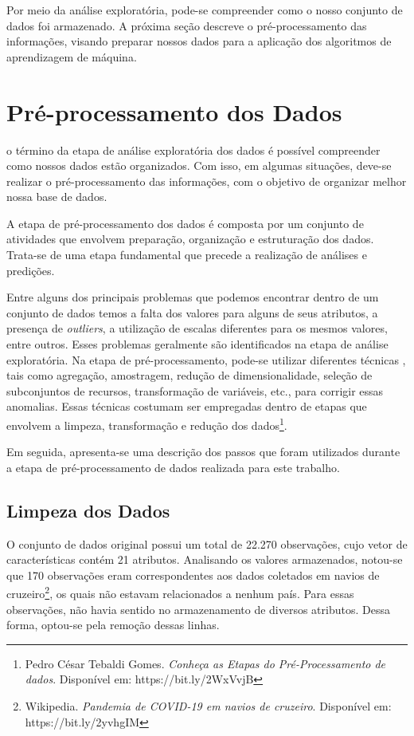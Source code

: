 \documentclass{ieeeaccess}
\begin{document}
Por meio da análise exploratória, pode-se compreender como o nosso conjunto de dados foi armazenado. A próxima seção descreve o pré-processamento das informações, visando preparar nossos dados para a aplicação dos algoritmos de aprendizagem de máquina.

\section{Pré-processamento dos Dados}

\label{sec:introduction}  o término da etapa de análise exploratória dos dados é possível compreender como nossos dados estão organizados. Com isso, em algumas situações, deve-se realizar o pré-processamento das informações, com o objetivo de organizar melhor nossa base de dados. 

A etapa de pré-processamento dos dados é composta por um conjunto de atividades que envolvem preparação, organização e estruturação dos dados. Trata-se de uma etapa fundamental que precede a realização de análises e predições.

Entre alguns dos principais problemas que podemos encontrar dentro de um conjunto de dados temos a falta dos valores para alguns de seus atributos, a presença de \textit{ outliers}, a utilização de escalas diferentes para os mesmos valores, entre outros. Esses problemas geralmente são identificados na etapa de análise exploratória. Na etapa de pré-processamento, pode-se utilizar diferentes técnicas \cite{b20}, tais como agregação, amostragem, redução de dimensionalidade, seleção de subconjuntos de recursos, transformação de variáveis, etc., para corrigir essas anomalias. Essas técnicas costumam ser empregadas dentro de etapas que envolvem a limpeza, transformação e redução dos dados\footnote{Pedro César Tebaldi Gomes. \textit{Conheça as Etapas do Pré-Processamento de dados}. Disponível em: https://bit.ly/2WxVvjB}.

Em seguida, apresenta-se uma descrição dos passos que foram utilizados durante a etapa de pré-processamento de dados realizada para este trabalho.

\subsection{Limpeza dos Dados}

O conjunto de dados original possui um total de 22.270 observações, cujo vetor de características contém 21 atributos. Analisando os valores armazenados, notou-se que 170 observações eram correspondentes aos dados coletados em navios de cruzeiro\footnote{Wikipedia. \textit{Pandemia de COVID-19 em navios de cruzeiro}. Disponível em: https://bit.ly/2yvhgIM}, os quais não estavam relacionados a nenhum país. Para essas observações, não havia sentido no armazenamento de diversos atributos. Dessa forma, optou-se pela remoção dessas linhas. 
\end{document}
